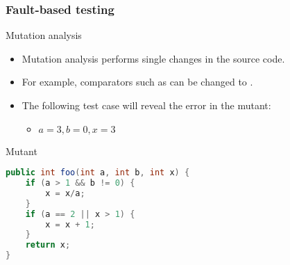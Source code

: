 \begin{frame}[hasprev=true, hasnext=false, fragile]
\frametitle{Fault-based testing}

\begin{block}{Mutation analysis}
\begin{itemize}
	\item Mutation analysis performs single changes in the source code.

	\item For example, comparators such as \srccode{==} can be changed to
	\srccode{!=}.

	\item The following test case will reveal the error in the mutant:
	\begin{itemize}
		\item $a = 3, b = 0, x = 3$
	\end{itemize}
\end{itemize}
\end{block}

\begin{block}{Mutant}
\vspace{-.20cm}
\begin{lstlisting}[language=java]
public int foo(int a, int b, int x) {
	if (a > 1 && b != 0) {
		x = x/a;
	}
	if (a == 2 || x > 1) {
		x = x + 1;
	}
	return x;
}
\end{lstlisting}
\end{block}

\end{frame}